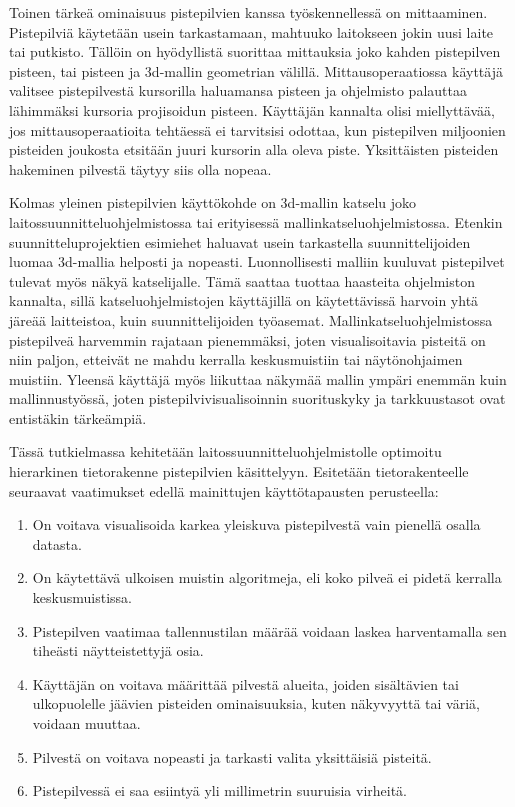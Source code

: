 \subtitle{Mittaaminen}
Toinen tärkeä ominaisuus pistepilvien kanssa työskennellessä on mittaaminen. Pistepilviä käytetään usein tarkastamaan, mahtuuko laitokseen jokin uusi laite tai putkisto. Tällöin on hyödyllistä suorittaa mittauksia joko kahden pistepilven pisteen, tai pisteen ja 3d-mallin geometrian välillä. Mittausoperaatiossa käyttäjä valitsee pistepilvestä kursorilla haluamansa pisteen ja ohjelmisto palauttaa lähimmäksi kursoria projisoidun pisteen. Käyttäjän kannalta olisi miellyttävää, jos mittausoperaatioita tehtäessä ei tarvitsisi odottaa, kun pistepilven miljoonien pisteiden joukosta etsitään juuri kursorin alla oleva piste. Yksittäisten pisteiden hakeminen pilvestä täytyy siis olla nopeaa.

\subtitle{Katselu}
Kolmas yleinen pistepilvien käyttökohde on 3d-mallin katselu joko laitossuunnitteluohjelmistossa tai erityisessä mallinkatseluohjelmistossa. Etenkin suunnitteluprojektien esimiehet haluavat usein tarkastella suunnittelijoiden luomaa 3d-mallia helposti ja nopeasti. Luonnollisesti malliin kuuluvat pistepilvet tulevat myös näkyä katselijalle. Tämä saattaa tuottaa haasteita ohjelmiston kannalta, sillä katseluohjelmistojen käyttäjillä on käytettävissä harvoin yhtä järeää laitteistoa, kuin suunnittelijoiden työasemat. Mallinkatseluohjelmistossa pistepilveä harvemmin rajataan pienemmäksi, joten visualisoitavia pisteitä on niin paljon, etteivät ne mahdu kerralla keskusmuistiin tai näytönohjaimen muistiin. Yleensä käyttäjä myös liikuttaa näkymää mallin ympäri enemmän kuin mallinnustyössä, joten pistepilvivisualisoinnin suorituskyky ja tarkkuustasot ovat entistäkin tärkeämpiä.

Tässä tutkielmassa kehitetään laitossuunnitteluohjelmistolle optimoitu hierarkinen tietorakenne pistepilvien käsittelyyn. Esitetään tietorakenteelle seuraavat vaatimukset edellä mainittujen käyttötapausten perusteella:
\begin{enumerate}
    \item \label{vaatimus:lod} On voitava visualisoida karkea yleiskuva pistepilvestä vain pienellä osalla datasta. 
    \item \label{vaatimus:ooc} On käytettävä ulkoisen muistin algoritmeja, eli koko pilveä ei pidetä kerralla keskusmuistissa.
    \item \label{vaatimus:harvennus} Pistepilven vaatimaa tallennustilan määrää voidaan laskea harventamalla sen tiheästi näytteistettyjä osia. 
    \item \label{vaatimus:crop} Käyttäjän on voitava määrittää pilvestä alueita, joiden sisältävien tai ulkopuolelle jäävien pisteiden ominaisuuksia, kuten näkyvyyttä tai väriä, voidaan muuttaa.
    \item \label{vaatimus:select} Pilvestä on voitava nopeasti ja tarkasti valita yksittäisiä pisteitä.
    \item \label{vaatimus:virhe} Pistepilvessä ei saa esiintyä yli millimetrin suuruisia virheitä.
\end{enumerate}



